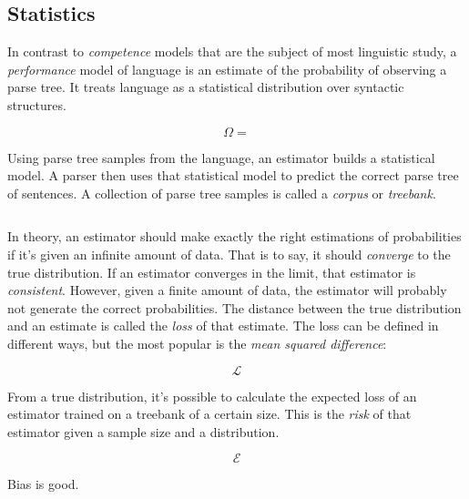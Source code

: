 \subsection{Statistics}
In contrast to \emph{competence} models that are the subject of most linguistic study, a \emph{performance} model of language is an estimate of the probability of observing a parse tree. It treats language as a statistical distribution over syntactic structures.

$$\Omega = $$

Using parse tree samples from the language, an estimator builds a statistical model. A parser then uses that statistical model to predict the correct parse tree of sentences.
A collection of parse tree samples is called a \emph{corpus} or \emph{treebank}.

$$  $$

In theory, an estimator should make exactly the right estimations of probabilities if it's given an infinite amount of data. That is to say, it should \emph{converge} to the true distribution. If an estimator converges in the limit, that estimator is \emph{consistent}.
However, given a finite amount of data, the estimator will probably not generate the correct probabilities. The distance between the true distribution and an estimate is called the \emph{loss} of that estimate. The loss can be defined in different ways, but the most popular is the \emph{mean squared difference}:

$$ \mathcal{L} $$

From a true distribution, it's possible to calculate the expected loss of an estimator trained on a treebank of a certain size. This is the \emph{risk} of that estimator given a sample size and a distribution.

$$ \mathcal{E} $$










Bias is good.
